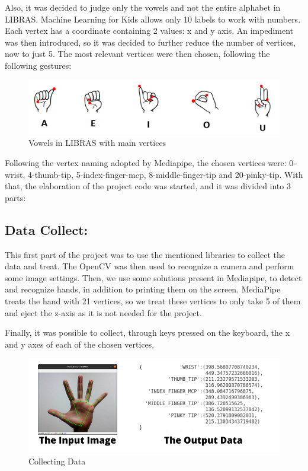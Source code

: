 \documentclass[a4paper, 12pt]{article}
\begin{document}
Also, it was decided to judge only the vowels and not the entire alphabet in LIBRAS. Machine Learning for Kids allows only 10 labels to work with numbers. Each vertex has a coordinate containing 2 values: x and y axis. An impediment was then introduced, so it was decided to further reduce the number of vertices, now to just 5. The most relevant vertices were then chosen, following the following gestures:
 
 
 \begin{figure}[!ht]
\centering
\includegraphics[scale=0.3]{hands_LIBRAS.png}
\caption{Vowels in LIBRAS with main vertices}
\label{figure_4}
\end{figure}
 
Following the vertex naming adopted by Mediapipe, the chosen vertices were: 0-wrist, 4-thumb-tip, 5-index-finger-mcp, 8-middle-finger-tip and 20-pinky-tip. With that, the elaboration of the project code was started, and it was divided into 3 parts:






\newpage
\subsection{Data Collect:}
This first part of the project was to use the mentioned libraries to collect the data and treat. The OpenCV was then used to recognize a camera and perform some image settings. Then, we use some solutions present in Mediapipe, to detect and recognize hands, in addition to printing them on the screen. MediaPipe treats the hand with 21 vertices, so we treat these vertices to only take 5 of them and eject the z-axis as it is not needed for the project.

Finally, it was possible to collect, through keys pressed on the keyboard, the x and y axes of each of the chosen vertices.

 \begin{figure}[!ht]
\centering
\includegraphics[scale=0.5]{data_collect.png}
\caption{Collecting Data}
\label{figure_6}
\end{figure}
\end{document}
